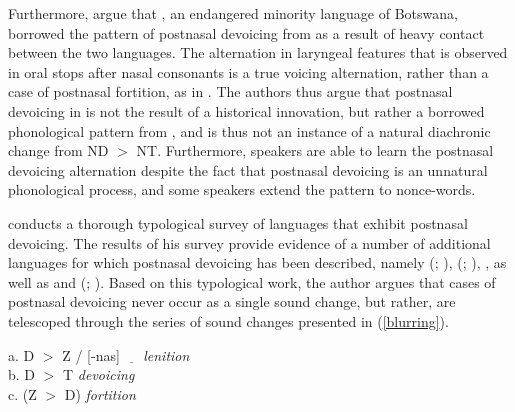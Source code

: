 \documentclass[output=paper,hidelinks]{langscibook}
\begin{document}
Furthermore, \citet{BoyerZsiga2013} argue that , an endangered minority language of Botswana, borrowed the pattern of postnasal devoicing from  as a result of heavy contact between the two languages. The alternation in laryngeal features that is observed in oral stops after nasal consonants is a true voicing alternation, rather than a case of postnasal fortition, as in . The authors thus argue that postnasal devoicing in  is not the result of a historical innovation, but rather a borrowed phonological pattern from , and is thus not an instance of a natural diachronic change from ND $>$ NT. Furthermore,  speakers are able to learn the postnasal devoicing alternation despite the fact that postnasal devoicing is an unnatural phonological process, and some speakers extend the pattern to nonce-words.

\citet{Begus2019} conducts a thorough typological survey of languages that exhibit postnasal devoicing. The results of his survey provide evidence of a number of additional languages for which postnasal devoicing has been described, namely  (; \citealt{Xromov1972}),  (; \citealt{Merrill2016}),  \citep{Kummel2007}, as well as  and  (; \citealt{Blust2005, Blust2013}). Based on this typological work, the author argues that cases of postnasal devoicing never occur as a single sound change, but rather, are telescoped through the series of sound changes presented in (\ref{blurring}).\largerpage

\ea\label{blurring} a. D $>$ Z / [-nas] $\underline{\hspace{1em}}$		\hspace{1.3cm} \textit{lenition}\\
b. D $>$ T					\hspace{3cm} \textit{devoicing}\\
c. (Z $>$ D)					\hspace{2.85cm} \textit{fortition}
\z
\end{document}
